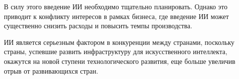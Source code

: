 
В силу этого введение ИИ необходимо тщательно планировать. Однако это приводит к конфликту интересов в рамках бизнеса, где введение ИИ может существенно снизить расходы и повысить темпы производства. 


ИИ является серьезным фактором в конкуренции между странами, поскольку страны, успевшие развить инфраструктуру для искусственного интеллекта, окажутся на новой ступени технологического развития, еще больше увеличив отрыв от развивающихся стран.



